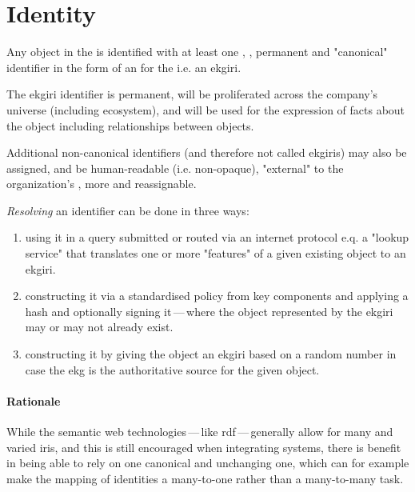 \section{Identity}\label{sec:ekg-principles-identity}

Any object in the  is identified with at least one , ,
permanent and  "canonical" identifier in the form of an  for
the  i.e. an \gls{ekgiri}.

The \gls{ekgiri} identifier is permanent, will be proliferated across the company's universe (including ecosystem),
and will be used for the expression of facts about the object including relationships between objects.

Additional non-canonical identifiers (and therefore not called \glspl{ekgiri}) may also be assigned,
and   be human-readable (i.e. non-opaque), "external" to
the organization's , more  and reassignable.

\textit{Resolving} an identifier can be done in three ways:
\begin{enumerate}
    \item using it in a query submitted or routed via an internet protocol e.q. a "lookup service" that translates
          one or more "features" of a given existing object to an \gls{ekgiri}.
    \item constructing it via a standardised policy from key components and applying a hash and optionally
          signing it\,---\,where the object represented by the \gls{ekgiri} may or may not already exist.
    \item constructing it by giving the object an \gls{ekgiri} based on a random number in case the \gls{ekg} is
          the authoritative source for the given object.
\end{enumerate}

\paragraph{Rationale}

While the semantic web technologies\,---\,like \gls{rdf}\,---\,generally allow for many and varied \glspl{iri},
and this is still encouraged when integrating systems, there is benefit in being able to rely on one canonical
and unchanging one, which can for example make the mapping of identities a many-to-one rather than a many-to-many task.

